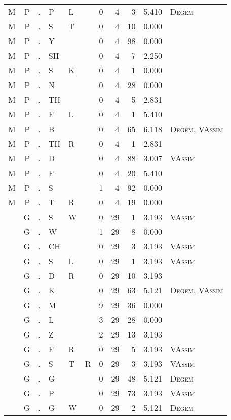 \begin{longtable}{r@{ } r@{ } c@{ } l@{ } l@{ } l@{ } r r r r l }
M & P & . & P & L &  & 0 & 4 & 3 & 5.410 & \textsc{Degem} \\
M & P & . & S & T &  & 0 & 4 & 10 & 0.000 &  \\
M & P & . & Y &  &  & 0 & 4 & 98 & 0.000 &  \\
M & P & . & SH &  &  & 0 & 4 & 7 & 2.250 &  \\
M & P & . & S & K &  & 0 & 4 & 1 & 0.000 &  \\
M & P & . & N &  &  & 0 & 4 & 28 & 0.000 &  \\
M & P & . & TH &  &  & 0 & 4 & 5 & 2.831 &  \\
M & P & . & F & L &  & 0 & 4 & 1 & 5.410 &  \\
M & P & . & B &  &  & 0 & 4 & 65 & 6.118 & \textsc{Degem}, \textsc{VAssim} \\
M & P & . & TH & R &  & 0 & 4 & 1 & 2.831 &  \\
M & P & . & D &  &  & 0 & 4 & 88 & 3.007 & \textsc{VAssim} \\
M & P & . & F &  &  & 0 & 4 & 20 & 5.410 &  \\
M & P & . & S &  &  & 1 & 4 & 92 & 0.000 &  \\
M & P & . & T & R &  & 0 & 4 & 19 & 0.000 &  \\
 & G & . & S & W &  & 0 & 29 & 1 & 3.193 & \textsc{VAssim} \\
 & G & . & W &  &  & 1 & 29 & 8 & 0.000 &  \\
 & G & . & CH &  &  & 0 & 29 & 3 & 3.193 & \textsc{VAssim} \\
 & G & . & S & L &  & 0 & 29 & 1 & 3.193 & \textsc{VAssim} \\
 & G & . & D & R &  & 0 & 29 & 10 & 3.193 &  \\
 & G & . & K &  &  & 0 & 29 & 63 & 5.121 & \textsc{Degem}, \textsc{VAssim} \\
 & G & . & M &  &  & 9 & 29 & 36 & 0.000 &  \\
 & G & . & L &  &  & 3 & 29 & 28 & 0.000 &  \\
 & G & . & Z &  &  & 2 & 29 & 13 & 3.193 &  \\
 & G & . & F & R &  & 0 & 29 & 5 & 3.193 & \textsc{VAssim} \\
 & G & . & S & T & R & 0 & 29 & 3 & 3.193 & \textsc{VAssim} \\
 & G & . & G &  &  & 0 & 29 & 48 & 5.121 & \textsc{Degem} \\
 & G & . & P &  &  & 0 & 29 & 73 & 3.193 & \textsc{VAssim} \\
 & G & . & G & W &  & 0 & 29 & 2 & 5.121 & \textsc{Degem} \\

\end{longtable}
